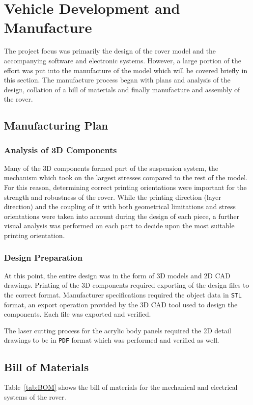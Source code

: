 \section{Vehicle Development and Manufacture}
\label{sec:vehicleBuildAndManufacture}
  The project focus was primarily the design of the rover model and the accompanying software and electronic systems. However, a large portion of the effort was put into the manufacture of the model which will be covered briefly in this section. The manufacture process began with plans and analysis of the design, collation of a bill of materials and finally manufacture and assembly of the rover.
  
  \subsection{Manufacturing Plan}
    \subsubsection{Analysis of 3D Components}
      Many of the 3D components formed part of the suspension system, the mechanism which took on the largest stresses compared to the rest of the model. For this reason, determining correct printing orientations were important for the strength and robustness of the rover. While the printing direction (layer direction) and the coupling of it with both geometrical limitations and stress orientations were taken into account during the design of each piece, a further visual analysis was performed on each part to decide upon the most suitable printing orientation.
      
    \subsubsection{Design Preparation}
      At this point, the entire design was in the form of 3D models and 2D CAD drawings. Printing of the 3D components required exporting of the design files to the correct format. Manufacturer specifications required the object data in \texttt{STL} format, an export operation provided by the 3D CAD tool used to design the components. Each file was exported and verified.
      
      The laser cutting process for the acrylic body panels required the 2D detail drawings to be in \texttt{PDF} format which was performed and verified as well.
    
  \subsection{Bill of Materials}
    Table~\ref{tab:BOM} shows the bill of materials for the mechanical and electrical systems of the rover.
  
